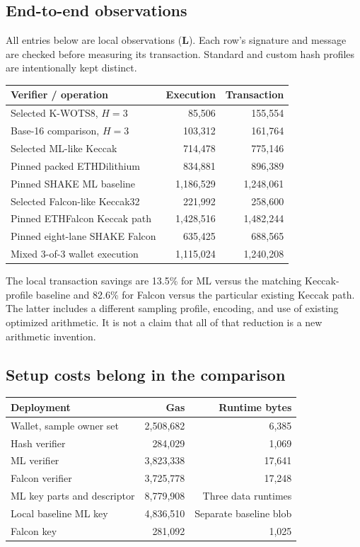 \documentclass[11pt,a4paper]{article}
\newcommand{\local}{\textbf{L}}
\begin{document}
\subsection{End-to-end observations}
All entries below are local observations (\local). Each row's signature and
message are checked before measuring its transaction. Standard and custom
hash profiles are intentionally kept distinct.

\begin{tabularx}{\linewidth}{Yrr}
\toprule
\textbf{Verifier / operation} & \textbf{Execution} & \textbf{Transaction}\\
\midrule
Selected K-WOTS8, $H=3$ & 85,506 & 155,554\\
Base-16 comparison, $H=3$ & 103,312 & 161,764\\
Selected ML-like Keccak & 714,478 & 775,146\\
Pinned packed ETHDilithium & 834,881 & 896,389\\
Pinned SHAKE ML baseline & 1,186,529 & 1,248,061\\
Selected Falcon-like Keccak32 & 221,992 & 258,600\\
Pinned ETHFalcon Keccak path & 1,428,516 & 1,482,244\\
Pinned eight-lane SHAKE Falcon & 635,425 & 688,565\\
Mixed 3-of-3 wallet execution & 1,115,024 & 1,240,208\\
\bottomrule
\end{tabularx}

The local transaction savings are 13.5\% for ML versus the matching
Keccak-profile baseline and 82.6\% for Falcon versus the particular
existing Keccak path. The latter includes a different sampling profile,
encoding, and use of existing optimized arithmetic. It is not a claim that
all of that reduction is a new arithmetic invention.

\subsection{Setup costs belong in the comparison}
\begin{tabularx}{\linewidth}{Yrr}
\toprule
\textbf{Deployment} & \textbf{Gas} & \textbf{Runtime bytes}\\
\midrule
Wallet, sample owner set & 2,508,682 & 6,385\\
Hash verifier & 284,029 & 1,069\\
ML verifier & 3,823,338 & 17,641\\
Falcon verifier & 3,725,778 & 17,248\\
ML key parts and descriptor & 8,779,908 & Three data runtimes\\
Local baseline ML key & 4,836,510 & Separate baseline blob\\
Falcon key & 281,092 & 1,025\\
\bottomrule
\end{tabularx}
\end{document}
